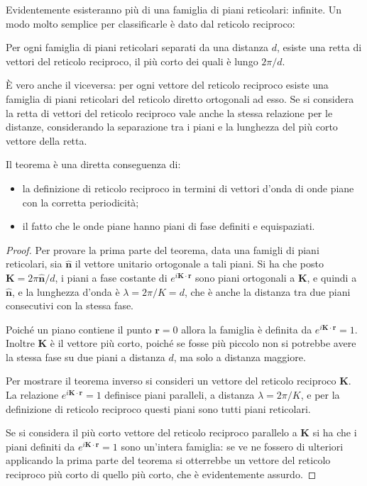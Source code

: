 Evidentemente esisteranno più di una famiglia di piani reticolari: infinite. Un modo molto semplice per classificarle è dato dal reticolo reciproco:

\begin{thm}
	Per ogni famiglia di piani reticolari separati da una distanza $ d $, esiste una retta di vettori del reticolo reciproco, il più corto dei quali è lungo $ 2\pi/d $.
	
	\`E vero anche il viceversa: per ogni vettore del reticolo reciproco esiste una famiglia di piani reticolari del reticolo diretto ortogonali ad esso. Se si considera la retta di vettori del reticolo reciproco vale anche la stessa relazione per le distanze, considerando la separazione tra i piani e la lunghezza del più corto vettore della retta.
\end{thm}

Il teorema è una diretta conseguenza di:
\begin{itemize}
	\item la definizione di reticolo reciproco in termini di vettori d'onda di onde piane con la corretta periodicità;
	\item il fatto che le onde piane hanno piani di fase definiti e equispaziati.
\end{itemize}

\begin{proof}
	Per provare la prima parte del teorema, data una famigli di piani reticolari, sia $ \hat{\textbf{n}} $ il vettore unitario ortogonale a tali piani.
	Si ha che posto $ \textbf{K} = 2\pi\hat{\textbf{n}}/d $, i piani a fase costante di $ e^{i\textbf{K}\cdot\textbf{r}} $ sono piani ortogonali a $ \textbf{K} $, e quindi a $ \hat{\textbf{n}} $, e la lunghezza d'onda è $ \lambda = 2\pi/K = d$, che è anche la distanza tra due piani consecutivi con la stessa fase.
	
	Poiché un piano contiene il punto $ \textbf{r} = 0 $ allora la famiglia è definita da $ e^{i\textbf{K}\cdot\textbf{r}} = 1 $. Inoltre $ \textbf{K} $ è il vettore più corto, poiché se fosse più piccolo non si potrebbe avere la stessa fase su due piani a distanza $ d $, ma solo a distanza maggiore.
	
	Per mostrare il teorema inverso si consideri un vettore del reticolo reciproco $ \textbf{K} $. La relazione $ e^{i\textbf{K}\cdot\textbf{r}} = 1 $ definisce piani paralleli, a distanza $ \lambda = 2\pi/K $, e per la definizione di reticolo reciproco questi piani sono tutti piani reticolari.
	
	Se si considera il più corto vettore del reticolo reciproco parallelo a $ \textbf{K} $ si ha che i piani definiti da $ e^{i\textbf{K}\cdot\textbf{r}} = 1 $ sono un'intera famiglia: se ve ne fossero di ulteriori applicando la prima parte del teorema si otterrebbe un vettore del reticolo reciproco più corto di quello più corto, che è evidentemente assurdo.
\end{proof}

